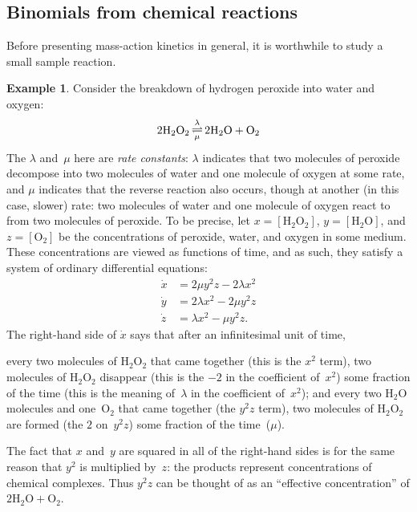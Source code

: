 \documentclass[12pt]{amsart}
\numberwithin{equation}{section}
\theoremstyle{definition}
\newtheorem{example}[thm]{Example}
\begin{document}
\subsection{Binomials from chemical reactions}\label{s:mass-action}
Before presenting mass-action kinetics in general, it is worthwhile to
study a small sample reaction.

\begin{example}\label{e:peroxide}
Consider the breakdown of hydrogen peroxide into water and oxygen:
$$  2{\ensuremath{\text{H}_{\text{2}}\text{O}_{\text{2}}}}
  {	\mathbin{\begin{array}{@{\,}c@{\,}}
		\\[-3.5ex]\scriptstyle\lambda
		\\[-1.2ex]\rightleftharpoons
		\\[-1.5ex]\scriptstyle\mu
	\end{array}}}
  2{\ensuremath{\text{H}_{\text{2}}\text{O}}} + {\text{O}_{\text{2}}}
$$
The $\lambda$ and~$\mu$ here are \emph{rate constants}: $\lambda$
indicates that two molecules of peroxide decompose into two molecules
of water and one molecule of oxygen at some rate, and $\mu$ indicates
that the reverse reaction also occurs, though at another (in this
case, slower) rate: two molecules of water and one molecule of oxygen
react to from two molecules of peroxide.  To be precise, let $x =
[{\ensuremath{\text{H}_{\text{2}}\text{O}_{\text{2}}}}]$, $y = [{\ensuremath{\text{H}_{\text{2}}\text{O}}}]$, and $z = [{\text{O}_{\text{2}}}]$ be the
concentrations of peroxide, water, and oxygen in some medium.  These
concentrations are viewed as functions of time, and as such, they
satisfy a system of ordinary differential equations:
\begin{align*}
  \dot x &= 2\mu y^2 z - 2\lambda x^2
\\
  \dot y &= 2\lambda x^2 - 2\mu y^2 z
\\
  \dot z &= \lambda x^2 - \mu y^2 z.
\end{align*}
The right-hand side of $\dot x$ says that after an infinitesimal unit
of time,
\begin{itemize}
\itemfor every two molecules of ${\ensuremath{\text{H}_{\text{2}}\text{O}_{\text{2}}}}$ that came together (this is the
$x^2$ term), two molecules of ${\ensuremath{\text{H}_{\text{2}}\text{O}_{\text{2}}}}$ disappear (this is the $-2$
in the
coefficient of~$x^2$) some fraction of the time (this is the meaning
of~$\lambda$ in the coefficient of~$x^2$); and
\itemfor every two ${\ensuremath{\text{H}_{\text{2}}\text{O}}}$ molecules and one~${\text{O}_{\text{2}}}$ that came together
(the $y^2z$ term), two molecules of ${\ensuremath{\text{H}_{\text{2}}\text{O}_{\text{2}}}}$ are formed (the $2$
on~$y^2z$) some fraction of the time~($\mu$).
\end{itemize}
The fact that $x$ and~$y$ are squared in all of the right-hand sides
is for the same reason that $y^2$ is multiplied by~$z$: the products
represent concentrations of chemical complexes.  Thus $y^2z$ can be
thought of as an ``effective concentration'' of $2{\ensuremath{\text{H}_{\text{2}}\text{O}}} + {\text{O}_{\text{2}}}$.
\end{example}
\end{document}
